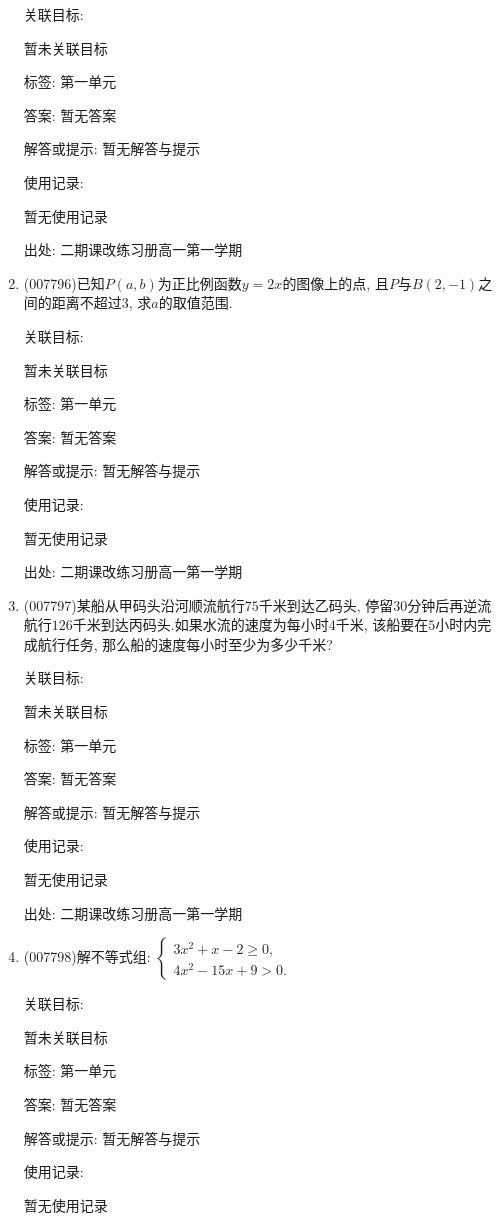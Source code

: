 \documentclass[10pt,a4paper]{article}
\begin{document}
\begin{enumerate}[1.]
关联目标:

暂未关联目标



标签: 第一单元

答案: 暂无答案

解答或提示: 暂无解答与提示

使用记录:

暂无使用记录


出处: 二期课改练习册高一第一学期
\item { (007796)}已知$P(a,b)$为正比例函数$y=2x$的图像上的点, 且$P$与$B(2,-1)$之间的距离不超过$3$, 求$a$的取值范围.


关联目标:

暂未关联目标



标签: 第一单元

答案: 暂无答案

解答或提示: 暂无解答与提示

使用记录:

暂无使用记录


出处: 二期课改练习册高一第一学期
\item { (007797)}某船从甲码头沿河顺流航行$75$千米到达乙码头, 停留$30$分钟后再逆流航行$126$千米到达丙码头.如果水流的速度为每小时$4$千米, 该船要在$5$小时内完成航行任务, 那么船的速度每小时至少为多少千米?


关联目标:

暂未关联目标



标签: 第一单元

答案: 暂无答案

解答或提示: 暂无解答与提示

使用记录:

暂无使用记录


出处: 二期课改练习册高一第一学期
\item { (007798)}解不等式组: $\begin{cases} 3x^2+x-2\ge 0, \\ 4x^2-15x+9>0. \end{cases}$


关联目标:

暂未关联目标



标签: 第一单元

答案: 暂无答案

解答或提示: 暂无解答与提示

使用记录:

暂无使用记录



\end{enumerate}
\end{document}
